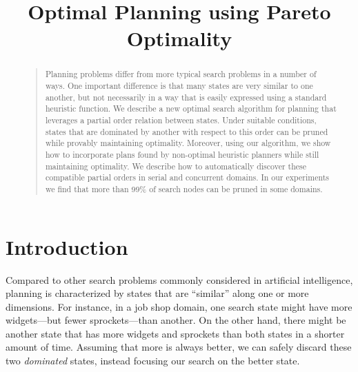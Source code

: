 \documentclass[letterpaper]{article}
\theoremstyle{plain} \newtheorem{theorem}{Theorem} \newtheorem{proposition}{Proposition} \newtheorem{lemma}{Lemma} \newtheorem*{corollary}{Corollary}
\theoremstyle{definition} \newtheorem{definition}{Definition} \newtheorem{conjecture}{Conjecture} \newtheorem*{example}{Example}
\theoremstyle{remark} \newtheorem*{remark}{Remark} \newtheorem*{note}{Note} \newtheorem{case}{Case}
\begin{document}
%
\title{Optimal Planning using Pareto Optimality}

\maketitle
\begin{abstract}
\begin{quote}
  Planning problems differ from more typical search problems in a
  number of ways.  One important difference is that many states are
  very similar to one another, but not necessarily in a way that
  is easily expressed using a standard heuristic function.  We
  describe a new optimal search algorithm for planning that leverages
  a partial order relation between states. Under suitable conditions,
  states that are dominated by another with respect to this order
  can be pruned while provably maintaining optimality.  Moreover,
  using our algorithm, we show how to incorporate plans found by
  non-optimal heuristic planners while still maintaining optimality.
  We describe how to automatically discover these compatible partial
  orders in serial and concurrent domains.  In our experiments we
  find that more than 99\% of search nodes can be pruned in some
  domains.
\end{quote}
\end{abstract}

\section{Introduction}

Compared to other search problems commonly considered in artificial
intelligence, planning is characterized by states that are ``similar''
along one or more dimensions.  For instance, in a job shop domain,
one search state might have more widgets---but fewer sprockets---than
another. On the other hand, there might be another state that has
more widgets and sprockets than both states in a shorter amount of
time. Assuming that more is always better, we can safely discard
these two \textit{dominated} states, instead focusing our search
on the better state.
\end{document}
